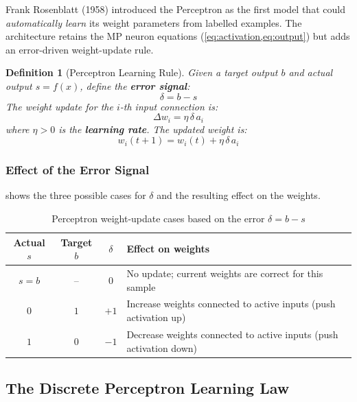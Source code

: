 \documentclass[12pt,a4paper]{article}
\newtheorem{definition}{Definition}[section]
\begin{document}
Frank Rosenblatt (1958) introduced the Perceptron as the first model
that could \emph{automatically learn} its weight parameters from labelled
examples.
The architecture retains the MP neuron equations (\cref{eq:activation,eq:output})
but adds an error-driven weight-update rule.

\begin{definition}[Perceptron Learning Rule]
\label{def:perceptron-rule}
Given a target output $b$ and actual output $s = f(x)$, define the
\textbf{error signal}:
\begin{equation}
  \delta = b - s
  \label{eq:error}
\end{equation}
The weight update for the $i$-th input connection is:
\begin{equation}
  \Delta w_i = \eta\,\delta\,a_i
  \label{eq:delta-w}
\end{equation}
where $\eta > 0$ is the \textbf{learning rate}.
The updated weight is:
\begin{equation}
  w_i(t+1) = w_i(t) + \eta\,\delta\,a_i
  \label{eq:update-rule}
\end{equation}
\end{definition}

\subsubsection{Effect of the Error Signal}
\label{subsubsec:error-effect}

 shows the three possible cases for $\delta$ and
the resulting effect on the weights.

\begin{table}[ht]
\centering
\caption{Perceptron weight-update cases based on the error $\delta = b - s$}
\label{tab:error-cases}
\begin{tabular}{cccp{6.5cm}}
\toprule
\textbf{Actual} $s$ & \textbf{Target} $b$ & $\delta$ & \textbf{Effect on weights} \\
\midrule
$s = b$  & --  & $0$  & No update; current weights are correct for this sample \\
$0$      & $1$ & $+1$ & Increase weights connected to active inputs (push activation up) \\
$1$      & $0$ & $-1$ & Decrease weights connected to active inputs (push activation down) \\
\bottomrule
\end{tabular}
\end{table}

\subsection{The Discrete Perceptron Learning Law}
\label{subsec:discrete-perceptron}
\end{document}
